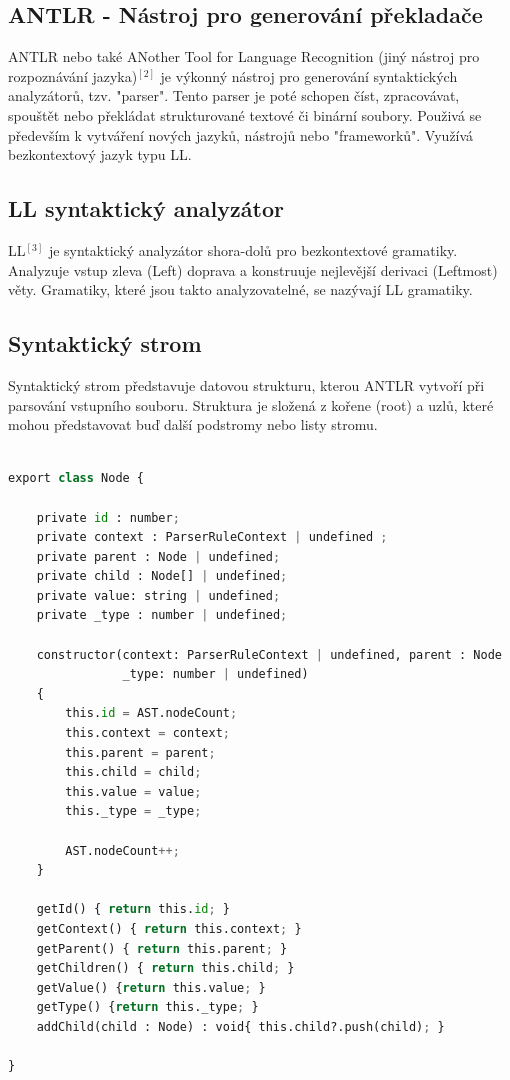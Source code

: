 \documentclass[czech,master,dept460,male,cpp,cpdeclaration]{diploma}
\begin{document}
\subsection{ANTLR - Nástroj pro generování překladače}
ANTLR nebo také ANother Tool for Language Recognition (jiný nástroj pro rozpoznávání jazyka)$^{[2]}$ je výkonný nástroj pro generování syntaktických analyzátorů, tzv. "parser". Tento parser je poté schopen číst, zpracovávat, spouštět nebo překládat strukturované textové či binární soubory. Použivá se především k vytváření nových jazyků, nástrojů nebo "frameworků". Využívá bezkontextový jazyk typu LL.
\subsection{LL syntaktický analyzátor}
LL$^{[3]}$ je syntaktický analyzátor shora-dolů pro bezkontextové gramatiky. Analyzuje vstup zleva (Left) doprava a konstruuje nejlevější derivaci (Leftmost) věty. Gramatiky, které jsou takto analyzovatelné, se nazývají LL gramatiky.

\subsection{Syntaktický strom}
Syntaktický strom představuje datovou strukturu, kterou ANTLR vytvoří při parsování vstupního souboru. Struktura je složená z kořene (root) a uzlů, které mohou představovat buď další podstromy nebo listy stromu. 


\begin{center}
\begin{lstlisting}[language=Python,label=src:PythonListing,caption={třída Node v jazyce Typescript}]

export class Node {  

    private id : number;
    private context : ParserRuleContext | undefined ;
    private parent : Node | undefined;
    private child : Node[] | undefined;
    private value: string | undefined;
    private _type : number | undefined;

    constructor(context: ParserRuleContext | undefined, parent : Node | undefined, child : Node[] | undefined, value : string | undefined,
                _type: number | undefined) 
    {
        this.id = AST.nodeCount;
        this.context = context;
        this.parent = parent;
        this.child = child;
        this.value = value;
        this._type = _type;

        AST.nodeCount++;
    }

    getId() { return this.id; }
    getContext() { return this.context; } 
    getParent() { return this.parent; }
    getChildren() { return this.child; }
    getValue() {return this.value; }
    getType() {return this._type; }
    addChild(child : Node) : void{ this.child?.push(child); }

}
\end{lstlisting}
\end{center}
\end{document}
